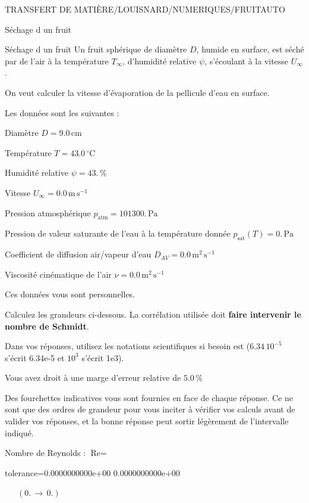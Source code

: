 \documentclass[12pt]{article}
\begin{document}
\begin{quiz}{TRANSFERT DE MATIÈRE/LOUISNARD/NUMERIQUES/FRUITAUTO}
\begin{cloze}{Séchage d un fruit}
\end{cloze} 


 \begin{cloze}{Séchage d un fruit} 
Un fruit sphérique de diamètre $D$, humide en surface, est séché par de l'air à la température $T_\infty$, d'humidité relative $\psi$, s'écoulant à la vitesse $U_\infty$.

On veut calculer la vitesse d'évaporation de la pellicule d'eau en surface.

 

Les données sont les suivantes :

 

Diamètre $D = 9.0\,  \mathrm{cm} $

Température $T = 43.0\,  \mathrm{^\circ\mathrm{C}} $

Humidité relative $\psi = 43.\, \% $

Vitesse $U_\infty = 0.0\,  \mathrm{m}\,  \mathrm{s}^{-1} $

Pression atmosphérique $p_{\text{atm}} = 101300.\,  \mathrm{Pa} $

Pression de valeur saturante de l’eau à la température donnée $p_{\text{sat}}(T) = 0.\,  \mathrm{Pa} $

Coefficient de diffusion air/vapeur d’eau $D_{AV} = 0.0\,  \mathrm{m}^{2}\,  \mathrm{s}^{-1} $

Viscosité cinématique de l’air $\nu = 0.0\,  \mathrm{m}^{2}\,  \mathrm{s}^{-1} $

Ces données vous sont personnelles.

 

Calculez les grandeurs ci-dessous. La corrélation utilisée doit \textbf{faire intervenir le nombre de Schmidt}.

Dans vos réponses, utilisez les notations scientifiques si besoin est ($6.34\, 10^{-5}$ s'écrit 6.34e-5 et $10^{3}$ s'écrit 1e3).

Vous avez droit à une marge d'erreur relative de $5.0\, \% $

Des fourchettes indicatives vous sont fournies en face de chaque réponse. Ce ne sont que des ordres de grandeur pour vous inciter à vérifier vos calculs avant de valider vos réponses, et la bonne réponse peut sortir légèrement de l'intervalle indiqué.

 

Nombre de Reynolds : $\text{Re} =  $
\begin{numerical}[points=1] 
\item[tolerance={0.0000000000e+00}] 0.0000000000e+00 
\end{numerical} 
 $\,$ 
 $ \quad (0. \, \rightarrow \, 0.) $ 


\end{cloze}
\end{quiz}
\end{document}
